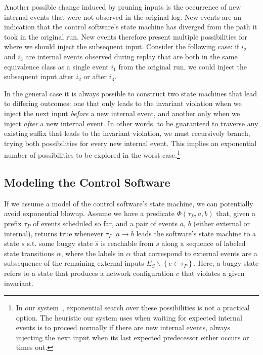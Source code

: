 Another possible change induced by pruning inputs is the occurrence of new
internal events that were not observed in the original log.
New events are an indication that the control software's state machine has
diverged from the path it took in the original run. New events therefore present multiple
possibilities for where
we should inject the subsequent input. Consider the following case:
if $i_2$ and $i_3$ are internal events observed
during replay that are both in the same equivalence class as a single event $i_1$ from the
original run, we could inject the subsequent input after $i_2$ or after $i_3$.



In the general case it is always possible to construct two state machines that lead
to differing outcomes: one that only leads to the invariant violation when
we inject the next input
\emph{before} a new internal event, and another only when we inject \emph{after} a new internal
event. In other words, to be guaranteed to traverse any existing suffix that leads
to the invariant violation, we must recursively branch, trying both
possibilities for every new internal event. This implies an exponential number of
possibilities to be explored in the worst case.\footnote{
In our system~\cite{sts}, exponential search over these possibilities is not a practical option.
The heuristic our system uses when waiting for expected internal
events is to proceed normally if there are new internal events,
always injecting the next input when its last expected predecessor
either occurs or times out.}

\subsection{Modeling the Control Software}

If we assume a model of the control software's state machine, we can potentially
avoid exponential blowup. Assume we have a predicate $\Phi(\tau_P, a, b)$
that, given a prefix $\tau_P$ of events scheduled so far, and a pair of events $a$, $b$
(either external or internal), returns true whenever $\tau_P || a \rightarrow
b$ leads the software's state machine to a state $s$ s.t. some buggy state
$\hat{s}$ is reachable from $s$ along a sequence of labeled state transitions
$\alpha$, where the labels in $\alpha$
that correspond to external events are a subsequence of the remaining external inputs $E_S
\backslash \left\{ e \in \tau_P \right\}$. 
Here, a buggy state refers to
a state that produces a network configuration $c$ that violates a given
invariant.

